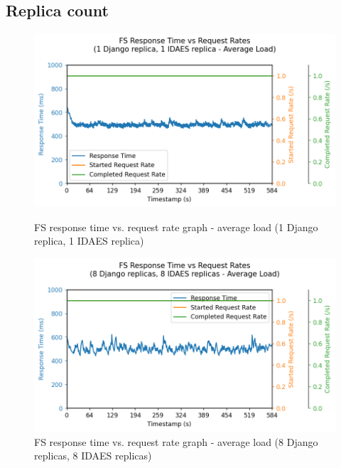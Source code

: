 \subsection{Replica count}

\begin{figure}[h]
    \centering
    \begin{minipage}{.47\textwidth}
        \centering
        \includegraphics[width=\linewidth]{figures/fs-replica-count-i1-response-graph-average.png}
        \caption{FS response time vs. request rate graph - average load (1 Django replica, 1 IDAES replica)}
        \label{figure:fs-replica-count-i1-average-response-graph}
    \end{minipage}%
    \hspace{0.05\textwidth} %
    \begin{minipage}{.47\textwidth}
        \centering
        \includegraphics[width=\linewidth]{figures/fs-replica-count-i4-response-graph-average.png}
        \caption{FS response time vs. request rate graph - average load (8 Django replicas, 8 IDAES replicas)}
        \label{figure:fs-replica-count-i4-average-response-graph}
    \end{minipage}
\end{figure}

